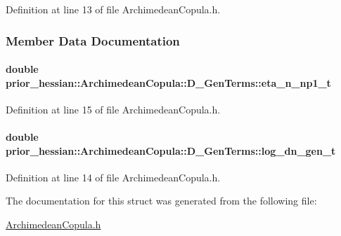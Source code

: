 Definition at line 13 of file Archimedean\+Copula.\+h.



\subsubsection{Member Data Documentation}
\paragraph[{\texorpdfstring{eta\+\_\+n\+\_\+np1\+\_\+t}{eta_n_np1_t}}]{\setlength{\rightskip}{0pt plus 5cm}double prior\+\_\+hessian\+::\+Archimedean\+Copula\+::\+D\+\_\+\+Gen\+Terms\+::eta\+\_\+n\+\_\+np1\+\_\+t}\hypertarget{structprior__hessian_1_1ArchimedeanCopula_1_1D__GenTerms_a5dff2f37bb7e708a87415b0f7546eb6b}{}\label{structprior__hessian_1_1ArchimedeanCopula_1_1D__GenTerms_a5dff2f37bb7e708a87415b0f7546eb6b}


Definition at line 15 of file Archimedean\+Copula.\+h.

\paragraph[{\texorpdfstring{log\+\_\+dn\+\_\+gen\+\_\+t}{log_dn_gen_t}}]{\setlength{\rightskip}{0pt plus 5cm}double prior\+\_\+hessian\+::\+Archimedean\+Copula\+::\+D\+\_\+\+Gen\+Terms\+::log\+\_\+dn\+\_\+gen\+\_\+t}\hypertarget{structprior__hessian_1_1ArchimedeanCopula_1_1D__GenTerms_a32ee7fddd5bbd1af598c8d21015c7125}{}\label{structprior__hessian_1_1ArchimedeanCopula_1_1D__GenTerms_a32ee7fddd5bbd1af598c8d21015c7125}


Definition at line 14 of file Archimedean\+Copula.\+h.



The documentation for this struct was generated from the following file\+:\begin{DoxyCompactItemize}
\item 
\hyperlink{ArchimedeanCopula_8h}{Archimedean\+Copula.\+h}\end{DoxyCompactItemize}

